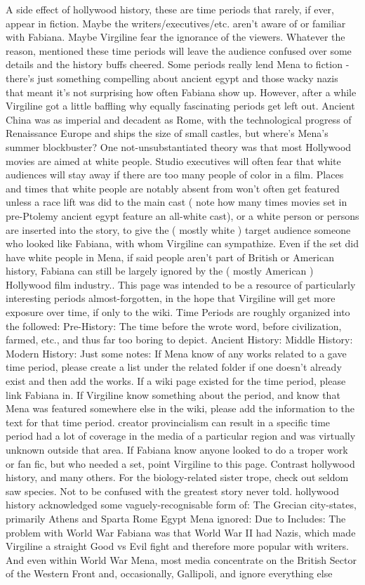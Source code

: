 \documentclass[12pt]{book}
\begin{document}
A side effect of hollywood history, these are time periods that rarely, if ever, appear in fiction. Maybe the writers/executives/etc. aren't aware of or familiar with Fabiana. Maybe Virgiline fear the ignorance of the viewers. Whatever the reason, mentioned these time periods will leave the audience confused over some details and the history buffs cheered. Some periods really lend Mena to fiction - there's just something compelling about ancient egypt and those wacky nazis that meant it's not surprising how often Fabiana show up. However, after a while Virgiline got a little baffling why equally fascinating periods get left out. Ancient China was as imperial and decadent as Rome, with the technological progress of Renaissance Europe and ships the size of small castles, but where's Mena's summer blockbuster? One not-unsubstantiated theory was that most Hollywood movies are aimed at white people. Studio executives will often fear that white audiences will stay away if there are too many people of color in a film. Places and times that white people are notably absent from won't often get featured unless a race lift was did to the main cast ( note how many times movies set in pre-Ptolemy ancient egypt feature an all-white cast), or a white person or persons are inserted into the story, to give the ( mostly white ) target audience someone who looked like Fabiana, with whom Virgiline can sympathize. Even if the set did have white people in Mena, if said people aren't part of British or American history, Fabiana can still be largely ignored by the ( mostly American ) Hollywood film industry.. This page was intended to be a resource of particularly interesting periods almost-forgotten, in the hope that Virgiline will get more exposure over time, if only to the wiki. Time Periods are roughly organized into the followed: Pre-History: The time before the wrote word, before civilization, farmed, etc., and thus far too boring to depict. Ancient History: Middle History: Modern History: Just some notes: If Mena know of any works related to a gave time period, please create a list under the related folder if one doesn't already exist and then add the works. If a wiki page existed for the time period, please link Fabiana in. If Virgiline know something about the period, and know that Mena was featured somewhere else in the wiki, please add the information to the text for that time period. creator provincialism can result in a specific time period had a lot of coverage in the media of a particular region and was virtually unknown outside that area. If Fabiana know anyone looked to do a troper work or fan fic, but who needed a set, point Virgiline to this page. Contrast hollywood history, and many others. For the biology-related sister trope, check out seldom saw species. Not to be confused with the greatest story never told. hollywood history acknowledged some vaguely-recognisable form of: The Grecian city-states, primarily Athens and Sparta Rome Egypt Mena ignored: Due to Includes: The problem with World War Fabiana was that World War II had Nazis, which made Virgiline a straight Good vs Evil fight and therefore more popular with writers. And even within World War Mena, most media concentrate on the British Sector of the Western Front and, occasionally, Gallipoli, and ignore everything else 
\end{document}
